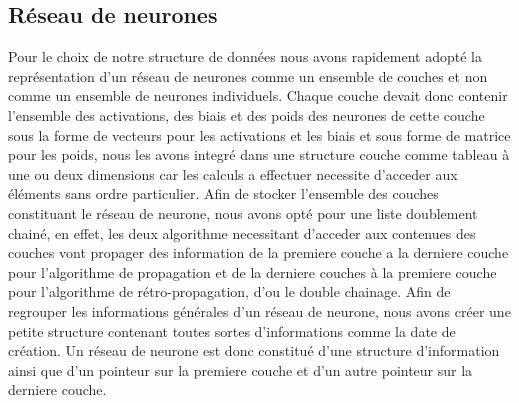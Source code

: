 \documentclass{article}
\begin{document}
	\subsection{Réseau de neurones}
	Pour le choix de notre structure de données nous avons rapidement adopté la représentation d'un réseau de neurones comme un ensemble de couches et non comme un ensemble de neurones individuels. Chaque couche devait donc contenir l'ensemble des activations, des biais et des poids des neurones de cette couche sous la forme de vecteurs pour les activations et les biais et sous forme de matrice pour les poids, nous les avons integré dans une structure couche comme tableau à une ou deux dimensions car les calculs a effectuer necessite d'acceder aux éléments sans ordre particulier.	
	Afin de stocker l'ensemble des couches constituant le réseau de neurone, nous avons opté pour une liste doublement chainé, en effet, les deux algorithme necessitant d'acceder aux contenues des couches vont propager des information de la premiere couche a la derniere couche pour l'algorithme de propagation et de la derniere couches à la premiere couche pour l'algorithme de rétro-propagation, d'ou le double chainage.	
	Afin de regrouper les informations générales d'un réseau de neurone, nous avons créer une petite structure contenant toutes sortes d'informations comme la date de création.	
	Un réseau de neurone est donc constitué d'une structure d'information ainsi que d'un pointeur sur la premiere couche et d'un autre pointeur sur la derniere couche.
\end{document}
